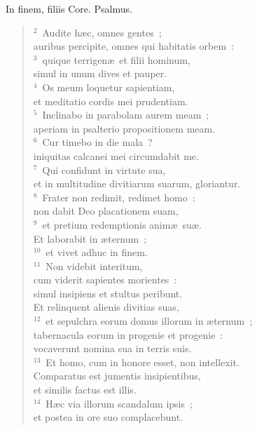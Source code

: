 \lettrine[lines=3,image=true,loversize=0.05,lraise=-0.03]{I}{}n finem, filiis Core. Psalmus.
\begin{flushleft}\begin{verse}\vspace{6pt}${}^{2}$~Audite h\ae c, omnes gentes~;\\ auribus percipite, omnes qui habitatis orbem~:\\
${}^{3}$~quique terrigen\ae\ et filii hominum,\\ simul in unum dives et pauper.\\
${}^{4}$~Os meum loquetur sapientiam,\\ et meditatio cordis mei prudentiam.\\
${}^{5}$~Inclinabo in parabolam aurem meam~;\\ aperiam in psalterio propositionem meam.\\
${}^{6}$~Cur timebo in die mala~?\\ iniquitas calcanei mei circumdabit me.\\
${}^{7}$~Qui confidunt in virtute sua,\\ et in multitudine divitiarum suarum, gloriantur.\\
${}^{8}$~Frater non redimit, redimet homo~:\\ non dabit Deo placationem suam,\\
${}^{9}$~et pretium redemptionis anim\ae\ su\ae .\\ Et laborabit in \ae ternum~;\\
${}^{10}$~et vivet adhuc in finem.\\
${}^{11}$~Non videbit interitum,\\ cum viderit sapientes morientes~:\\ simul insipiens et stultus peribunt.\\ Et relinquent alienis divitias suas,\\
${}^{12}$~et sepulchra eorum domus illorum in \ae ternum~;\\ tabernacula eorum in progenie et progenie~:\\ vocaverunt nomina sua in terris suis.\\
${}^{13}$~Et homo, cum in honore esset, non intellexit.\\ Comparatus est jumentis insipientibus,\\ et similis factus est illis.\\
${}^{14}$~H\ae c via illorum scandalum ipsis~;\\ et postea in ore suo complacebunt.\\

\end{verse}
\end{flushleft}
